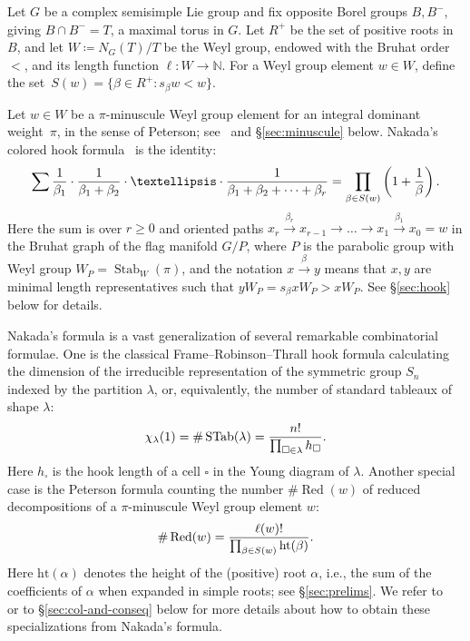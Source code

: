 \documentclass[11pt]{article}
\theoremstyle{definition}
\numberwithin{equation}{section}
\newcommand{\h}{\mathrm{ht}}
\DeclareMathOperator{\Red}{Red}
\DeclareMathOperator{\STab}{STab}
\DeclareMathOperator{\Stab}{Stab}
\begin{document}
Let $G$ be a complex semisimple Lie group and fix opposite Borel groups $B,B^-$, giving  
$B \cap B^- = T$, a maximal torus in $G$. Let $R^+$ be the set of positive roots in~$B$, and let $W\coloneqq N_G(T)/T$ be
the Weyl group, endowed with the Bruhat order~$<$, and its length function $\ell: W \to \mathbb{N}$. For a Weyl 
group element $w \in W$, define the set~$S(w) = \{ \beta \in R^+: s_\beta w < w \}$. 

Let $w\in W$ be a $\pi$-minuscule Weyl group element for an integral dominant weight~$\pi$, in the sense of Peterson;
see~\cite{proctor:bruhat,carrell:vector,proctor:minuscule,stembridge:fullycomm,stembridge2001minuscule,graham.kreiman:cominuscule_pt} 
and \S\ref{sec:minuscule} below. Nakada's colored hook formula~\cite{nakada:colored} is the identity:
\begin{equation}\label{E:Nakada-intro}
	\sum \frac{1}{\beta_1}\cdot \frac{1}{\beta_1+\beta_2}\cdot \ldots \cdot\frac{1}{\beta_1+\beta_2+\cdots +\beta_r}
	=\prod_{\beta\in S(w)}\left(1+\frac{1}{\beta}\right) \/.
\end{equation}
Here the sum is over $r \ge 0$ and
oriented paths $x_r\overset{\beta_r}{\to} x_{r-1}\to \ldots \to x_1\overset{\beta_1}{\to} x_0=w$
in the Bruhat graph of the flag manifold $G/P$, where $P$ is the parabolic group with Weyl group $W_P = \Stab_W(\pi)$,
and the notation $x \overset{\beta}{\to} y$ means that $x,y $ are minimal length representatives such that 
$y W_P= s_\beta x W_P >xW_P$. See \S\ref{sec:hook} below for details. 

Nakada's formula is a vast generalization of several remarkable combinatorial formulae. One is the classical 
Frame--Robinson--Thrall hook formula calculating the dimension of the 
irreducible representation of the symmetric group $S_n$ indexed by the partition $\lambda$, or, equivalently, 
the number of standard tableaux of shape $\lambda$:
\begin{equation*}\label{equ:hook}
	\chi_\lambda(1)=\#\STab(\lambda)= \frac{n!}{\prod_{\square\in \lambda}h_\square} \/.
\end{equation*}
Here $h_\square$ is the hook length of a cell $\square$ in the Young diagram of $\lambda$. 
Another special case is
the Peterson formula counting the number $\#\Red(w)$ of reduced decompositions of a 
$\pi$-minuscule Weyl group element $w$:
\begin{equation}\label{E:introredw} \#\Red(w)=\frac{\ell(w)!}{\prod_{\beta\in S(w)}\h(\beta)} \/. \end{equation}
Here $\h(\alpha)$ denotes the height of the (positive) root $\alpha$, i.e., the sum of the coefficients
	of $\alpha$ when expanded in simple roots; see \S\ref{sec:prelims}.
We refer to~\cite{nakada:colored} or to \S\ref{sec:col-and-conseq} below for more details about how to obtain these specializations from Nakada's formula. 
\end{document}
